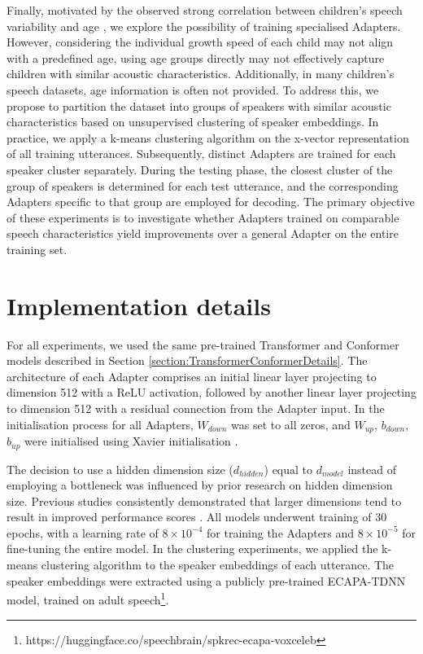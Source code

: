 Finally, motivated by the observed strong correlation between children's speech variability and age \cite{TFchildren}, we explore the possibility of training specialised Adapters. However, considering the individual growth speed of each child may not align with a predefined age, using age groups directly may not effectively capture children with similar acoustic characteristics. Additionally, in many children's speech datasets, age information is often not provided. To address this, we propose to partition the dataset into groups of speakers with similar acoustic characteristics based on unsupervised clustering of speaker embeddings.
In practice, we apply a k-means clustering algorithm on the x-vector representation \cite{snyder2018x} of all training utterances. Subsequently, distinct Adapters are trained for each speaker cluster separately. During the testing phase, the closest cluster of the group of speakers is determined for each test utterance, and the corresponding Adapters specific to that group are employed for decoding.
The primary objective of these experiments is to investigate whether Adapters trained on comparable speech characteristics yield improvements over a general Adapter on the entire training set. %

\section{Implementation details}

For all experiments, we used the same pre-trained Transformer and Conformer models described in Section \ref{section:TransformerConformerDetails}. The architecture of each Adapter comprises an initial linear layer projecting to dimension 512 with a \ac{ReLU} activation, followed by another linear layer projecting to dimension 512 with a residual connection from the Adapter input. In the initialisation process for all Adapters, $W_{down}$ was set to all zeros, and $W_{up}$, $b_{down}$, $b_{up}$ were initialised using Xavier initialisation \cite{glorot2010understanding}.

The decision to use a hidden dimension size ($d_{hidden}$) equal to $d_{model}$ instead of employing a bottleneck was influenced by prior research on hidden dimension size. Previous studies consistently demonstrated that larger dimensions tend to result in improved performance scores \cite{chen2023efficient}. All models underwent training of 30 epochs, with a learning rate of $8 \times 10^{-4}$ for training the Adapters and $8 \times 10^{-5}$ for fine-tuning the entire model. In the clustering experiments, we applied the k-means clustering algorithm to the speaker embeddings of each utterance. The speaker embeddings were extracted using a publicly pre-trained ECAPA-TDNN model, trained on adult speech\footnote{https://huggingface.co/speechbrain/spkrec-ecapa-voxceleb}.


